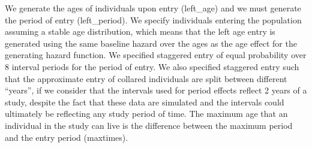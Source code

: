 \documentclass[11pt,]{article}
\begin{document}
We generate the ages of individuals upon entry (left\_age) and we must
generate the period of entry (left\_period). We specify individuals
entering the population assuming a stable age distribution, which means
that the left age entry is generated using the same baseline hazard over
the ages as the age effect for the generating hazard function. We
specified staggered entry of equal probability over 8 interval periods
for the period of entry. We also specified staggered entry such that the
approximate entry of collared individuals are split between different
``years'', if we consider that the intervals used for period effects
reflect 2 years of a study, despite the fact that these data are
simulated and the intervals could ultimately be reflecting any study
period of time. The maximum age that an individual in the study can live
is the difference between the maximum period and the entry period
(maxtimes).
\end{document}
